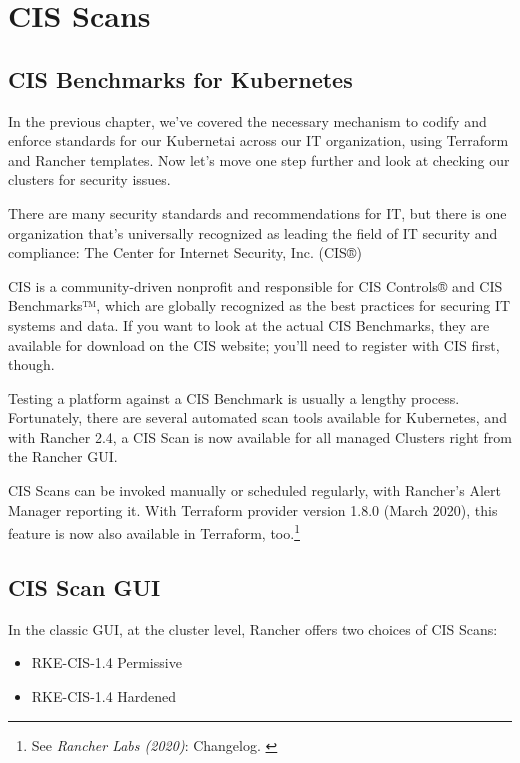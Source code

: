 %
%

\pagebreak
\section{CIS Scans}

\onehalfspacing

\subsection{CIS Benchmarks for Kubernetes}

In the previous chapter, we've covered the necessary mechanism to codify and enforce standards for our Kubernetai across our IT organization, using Terraform and Rancher templates. Now let's move one step further and look at checking our clusters for security issues.

There are many security standards and recommendations for IT, but there is one organization that's universally recognized as leading the field of IT security and compliance: The Center for Internet Security, Inc. (CIS®)

CIS is a community-driven nonprofit and responsible for CIS Controls® and CIS Benchmarks™, which are globally recognized as the best practices for securing IT systems and data. If you want to look at the actual CIS Benchmarks, they are available for download on the CIS website; you'll need to register with CIS first, though.

Testing a platform against a CIS Benchmark is usually a lengthy process. Fortunately, there are several automated scan tools available for Kubernetes, and with Rancher 2.4, a CIS Scan is now available for all managed Clusters right from the Rancher GUI.

CIS Scans can be invoked manually or scheduled regularly, with Rancher's Alert Manager reporting it. With Terraform provider version 1.8.0 (March 2020), this feature is now also available in Terraform, too.\footnote{See \textit{Rancher Labs (2020)}: Changelog. \cite{ChangeLog}}

\subsection{CIS Scan GUI}

In the classic GUI, at the cluster level, Rancher offers two choices of CIS Scans:

\begin{itemize}
\item RKE-CIS-1.4 Permissive
\item RKE-CIS-1.4 Hardened
\end{itemize}

